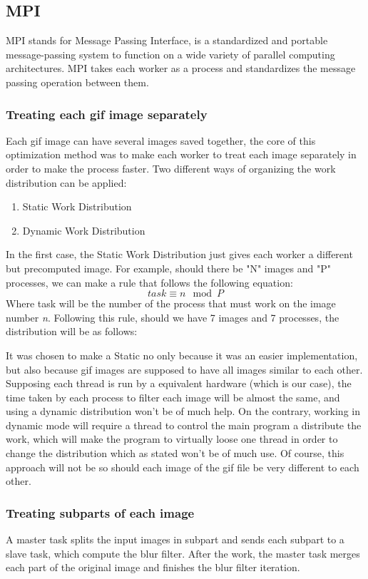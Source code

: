 \documentclass[conference,compsoc]{IEEEtran}
\begin{document}
\subsection{MPI}
MPI stands for Message Passing Interface, is a standardized and portable message-passing system to function on a wide variety of parallel computing architectures. MPI takes each worker as a process and standardizes the message passing operation between them.
\subsubsection{Treating each gif image separately}
Each gif image can have several images saved together, the core of this optimization method was to make each worker to treat each image separately in order to make the process faster.
Two different ways of organizing the work distribution can be applied:
\begin{enumerate}
	\item Static Work Distribution
	\item Dynamic Work Distribution
\end{enumerate}
In the first case, the Static Work Distribution just gives each worker a different but precomputed image. For example, should there be "N" images and "P" processes, we can make a rule that follows the following equation:
\begin{equation}
task \equiv n \mod P
\end{equation} 
Where task will be the number of the process that must work on the image number \textit{n}. Following this rule, should we have 7 images and 7 processes, the distribution will be as follows:

It was chosen to make a Static no only because it was an easier implementation, but also because gif images are supposed to have all images similar to each other. Supposing each thread is run by a equivalent hardware (which is our case), the time taken by each process to filter each image will be almost the same, and using a dynamic distribution won't be of much help.
On the contrary, working in dynamic mode will require a thread to control the main program a distribute the work, which will make the program to virtually loose one thread in order to change the distribution which as stated won't be of much use.
Of course, this approach will not be so should each image of the gif file be very different to each other.

\subsubsection{Treating subparts of each image} \label{sec:treating_subparts}
A master task splits the input images in subpart and sends each subpart to a slave task, which compute the blur filter.
After the work, the master task merges each part of the original image and finishes the blur filter iteration.
\end{document}
